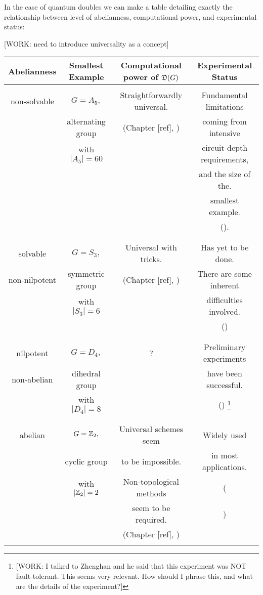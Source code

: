 In the case of quantum doubles we can make a table detailing exactly the relationship between level of abelianness, computational power, and experimental status:

[WORK: need to introduce universality as a concept]

\begin{center}
\begin{tabular}{|| c | c | c | c ||} 

\hline
Abelianness & Smallest Example& Computational power of $\mathfrak{D}(G)$& Experimental Status \\ [0.5ex] 
 \hline\hline
  &  & &\\ 
 non-solvable & $G=A_5,$ & Straightforwardly universal.& Fundamental limitations\\
  & alternating group & (Chapter [ref], \cite{mochon2003anyons})& coming from intensive\\ 
  & with $|A_5|=60$ & & circuit-depth requirements,\\ 
  &  & & and the size of the.\\ 
  &  & & smallest example.\\ 
  &  & & (\cite{bravyi2022adaptive}).\\ 
  &  & &\\ 
 \hline
  &  & &\\ 
 solvable& $G=S_3,$ & Universal with tricks. & Has yet to be done.\\
 non-nilpotent& symmetric group& (Chapter [ref], \cite{mochon2004anyon}) & There are some inherent \\ 
 & with $|S_3|=6$ & & difficulties involved.\\ 
  &  & & (\cite{tantivasadakarn2023hierarchy})\\ 
  &  & &\\ 
 \hline  &  & &\\ 
 nilpotent& $G=D_4,$ & ? & Preliminary experiments \\
 non-abelian& dihedral group & & have been successful.  \\ 
 & with $|D_4|=8$ & & (\cite{iqbal2024non}) \footnote{[WORK: I talked to Zhenghan and he said that this experiment was NOT fault-tolerant. This seems very relevant. How should I phrase this, and what are the details of the experiment?]}   \\ 
  &  & &\\ 
 \hline
  &  & &\\ 
 abelian & $G=\mathbb{Z}_2,$ & Universal schemes seem& Widely used\\ 
  & cyclic group & to be impossible.& in most applications. \\ 
  &with $|\mathbb{Z}_2|=2$ &  Non-topological methods& (\cite{bravyi2024high, hong2024entangling}\\ 
  &  & seem to be required.& \cite{balewski2024engineering, google2023suppressing})\\ 
  &  & (Chapter [ref], \cite{bravyi2013classification, eastin2009restrictions}) &\\ 
  &  & &\\ 
 \hline
\end{tabular}
\end{center}

